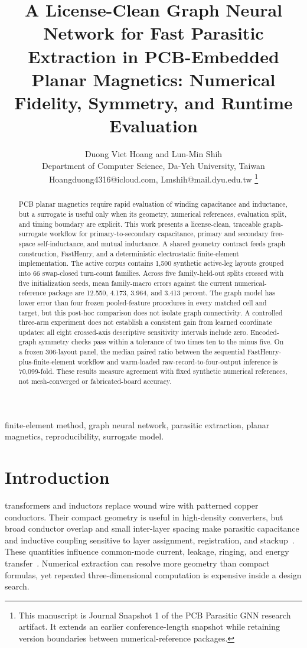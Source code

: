 \documentclass[journal]{IEEEtran}
\title{A License-Clean Graph Neural Network for Fast Parasitic Extraction in PCB-Embedded Planar Magnetics: Numerical Fidelity, Symmetry, and Runtime Evaluation}
\author{Duong Viet Hoang and Lun-Min Shih\\[-0.15ex]
\normalsize Department of Computer Science, Da-Yeh University, Taiwan\\[-0.15ex]
\normalsize Hoangduong4316@icloud.com, Lmshih@mail.dyu.edu.tw%
\thanks{This manuscript is Journal Snapshot 1 of the PCB Parasitic GNN research artifact. It extends an earlier conference-length snapshot while retaining version boundaries between numerical-reference packages.}}
\begin{document}
\maketitle

\begin{abstract}
PCB planar magnetics require rapid evaluation of winding capacitance and inductance, but a surrogate is useful only when its geometry, numerical references, evaluation split, and timing boundary are explicit. This work presents a license-clean, traceable graph-surrogate workflow for primary-to-secondary capacitance, primary and secondary free-space self-inductance, and mutual inductance. A shared geometry contract feeds graph construction, FastHenry, and a deterministic electrostatic finite-element implementation. The active corpus contains 1,500 synthetic active-leg layouts grouped into 66 swap-closed turn-count families. Across five family-held-out splits crossed with five initialization seeds, mean family-macro errors against the current numerical-reference package are 12.550, 4.173, 3.964, and 3.413 percent. The graph model has lower error than four frozen pooled-feature procedures in every matched cell and target, but this post-hoc comparison does not isolate graph connectivity. A controlled three-arm experiment does not establish a consistent gain from learned coordinate updates: all eight crossed-axis descriptive sensitivity intervals include zero. Encoded-graph symmetry checks pass within a tolerance of two times ten to the minus five. On a frozen 306-layout panel, the median paired ratio between the sequential FastHenry-plus-finite-element workflow and warm-loaded raw-record-to-four-output inference is 70,099-fold. These results measure agreement with fixed synthetic numerical references, not mesh-converged or fabricated-board accuracy.
\end{abstract}

\begin{IEEEkeywords}
finite-element method, graph neural network, parasitic extraction, planar magnetics, reproducibility, surrogate model.
\end{IEEEkeywords}

\section{Introduction}
 transformers and inductors replace wound wire with patterned copper conductors. Their compact geometry is useful in high-density converters, but broad conductor overlap and small inter-layer spacing make parasitic capacitance and inductive coupling sensitive to layer assignment, registration, and stackup~\cite{ouyang,hurley,mclyman,erickson}. These quantities influence common-mode current, leakage, ringing, and energy transfer~\cite{ott,paul}. Numerical extraction can resolve more geometry than compact formulas, yet repeated three-dimensional computation is expensive inside a design search.
\end{document}
